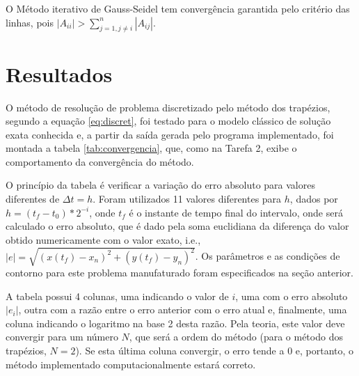 \documentclass[a4paper,10pt]{article}
\begin{document}
  
  
  O Método iterativo de Gauss-Seidel tem convergência garantida pelo critério das linhas, pois $|A_{ii}| > \sum\limits_{j=1, j\not=i}^{n}|A_{ij}|$.

  \section{Resultados}
  O método de resolução de problema discretizado pelo método dos trapézios, segundo a equação \ref{eq:discret}, foi testado para o modelo clássico de solução exata conhecida e, a partir da saída gerada pelo programa implementado, foi montada a tabela \ref{tab:convergencia}, que, como na Tarefa 2, exibe o comportamento da convergência do método.
  
  O princípio da tabela é verificar a variação do erro absoluto para valores diferentes de $\Delta t = h$. Foram utilizados 11 valores diferentes para $h$, dados por $h = (t_{f} - t_{0}) * 2 ^ {- i}$, onde $t_{f}$ é o instante de tempo final do intervalo, onde será calculado o erro absoluto, que é dado pela soma euclidiana da diferença do valor obtido numericamente com o valor exato, i.e., $|e| = \sqrt{(x(t_{f}) - x_{n})^{2} + (y(t_{f}) - y_{n})^2}$. Os parâmetros e as condições de contorno para este problema manufaturado foram especificados na seção anterior.
  
  A tabela possui 4 colunas, uma indicando o valor de $i$, uma com o erro absoluto $|e_{i}|$, outra com a razão entre o erro anterior com o erro atual e, finalmente, uma coluna indicando o logaritmo na base 2 desta razão. Pela teoria, este valor deve convergir para um número $N$, que será a ordem do método (para o método dos trapézios, $N = 2$). Se esta última coluna convergir, o erro tende a 0 e, portanto, o método implementado computacionalmente estará correto.
\end{document}
